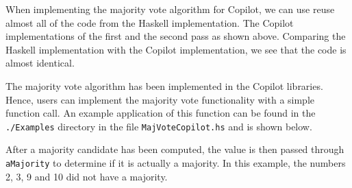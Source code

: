 When implementing the majority vote algorithm for Copilot, we can use reuse
almost all of the code from the Haskell implementation.
%
The Copilot implementations
of the first and the second pass as shown above. Comparing the Haskell implementation
with the Copilot implementation, we see that the code is almost identical.


The majority vote algorithm has been implemented in the Copilot libraries. 
Hence, users can implement the majority vote functionality with a simple function call. 
An example application of this function can be found in the {\tt ./Examples} directory in the file  {\tt MajVoteCopilot.hs} and is shown below.




 After a majority candidate has been computed,
  the value is then passed through {\tt aMajority} to determine if it is actually a majority. 
 In this example, the numbers 2, 3, 9 and 10 did not have a majority.  
